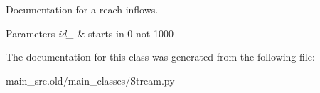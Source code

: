 Documentation for a reach inflows. 


\begin{DoxyParams}{Parameters}
{\em id\-\_\-} & starts in 0 not 1000 \\
\hline
\end{DoxyParams}


The documentation for this class was generated from the following file\-:\begin{DoxyCompactItemize}
\item 
main\-\_\-src.\-old/main\-\_\-classes/Stream.\-py\end{DoxyCompactItemize}
